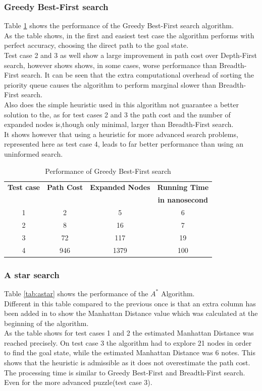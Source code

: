 \documentclass[journal]{IEEEtran}
\begin{document}
\subsubsection{Greedy Best-First search}
Table \ref{tab:gbfs} shows the performance of the Greedy Best-First search algorithm. \\
As the table shows, in the first and easiest test case the algorithm performs with perfect accuracy, choosing the direct path to the goal state. \\
Test case 2 and 3 as well show a large improvement in path cost over Depth-First search, however shows shows, in some cases, worse performance than Breadth-First search. It can be seen that the extra computational overhead of sorting the priority queue causes the algorithm to perform marginal slower than Breadth-First search.\\
Also does the simple heuristic used in this algorithm not guarantee a better solution to the, as for test cases 2 and 3 the path cost and the number of expanded nodes is,though only minimal, larger than Breadth-First search. \\
It shows however that using a heuristic for more advanced search problems, represented here as test case 4, leads to far better performance than using an uninformed search. \\
\begin{table}[h]
\renewcommand{\arraystretch}{1.3}
\centering
\caption{Performance of Greedy Best-First search}
\begin{tabular}{|c|c|c|c|}
\hline
\bfseries Test case &\bfseries Path Cost & \bfseries Expanded Nodes & \bfseries Running Time \\
 & & &\bfseries in nanosecond\\\hline
1 & 2 & 5 & 6 \\
2 & 8 & 16 &7 \\
3 & 72 & 117 &19 \\
4 & 946 & 1379 & 100 \\\hline
\end{tabular}
\label{tab:gbfs}
\end{table}

\subsubsection{A star search}
Table \ref{tab:astar} shows the performance of the $A^*$ Algorithm.\\
Different in this table compared to the previous once is that an extra column has been added in to show the Manhattan Distance value which was calculated at the beginning of the algorithm. \\
As the table shows for test cases 1 and 2 the estimated Manhattan Distance was reached precisely. On test case 3 the algorithm had to explore 21 nodes in order to find the goal state, while the estimated Manhattan Distance was 6 notes. This shows that the heuristic is admissible as it does not overestimate the path cost. \\
The processing time is similar to Greedy Best-First and Breadth-First search. Even for the more advanced puzzle(test case 3). \\
\end{document}
